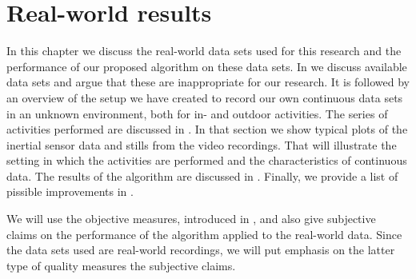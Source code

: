 
\chapter{Real-world results}

\label{Chapter6} %


In this chapter we discuss the real-world data sets used for this research and the performance of our proposed algorithm on these data sets.
In  we discuss available data sets and argue that these are inappropriate for our research.
It is followed by an overview of the setup we have created to record our own continuous data sets in an unknown environment, both for in- and outdoor activities.
The series of activities performed are discussed in .
In that section we show typical plots of the inertial sensor data and stills from the video recordings.
That will illustrate the setting in which the activities are performed and the characteristics of continuous data.
The results of the algorithm are discussed in .
Finally, we provide a list of pissible improvements in .

We will use the objective measures, introduced in , and also give subjective claims on the performance of the algorithm applied to the real-world data.
Since the data sets used are real-world recordings, we will put emphasis on the latter type of quality measures \ie the subjective claims.



